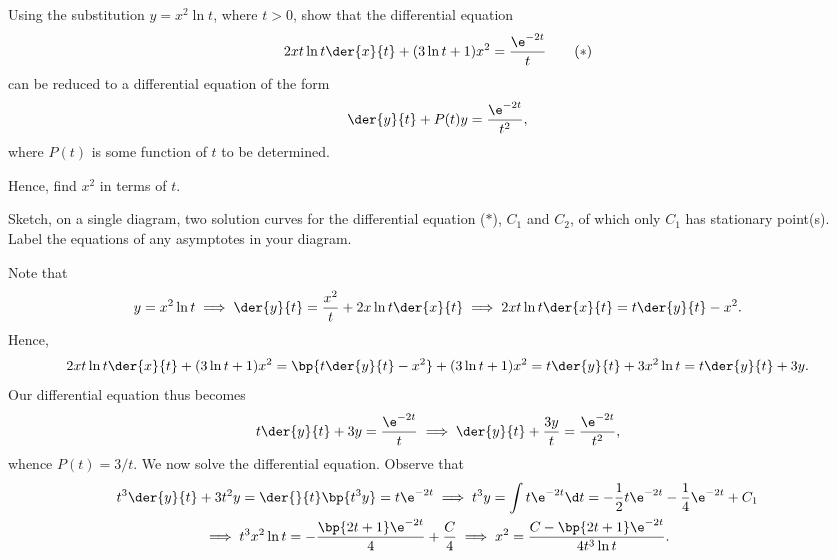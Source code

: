 \begin{problem}
    Using the substitution $y = x^2 \ln t$, where $t > 0$, show that the differential equation \[2xt \ln t \der{x}{t} + (3\ln t + 1)x^2 = \frac{\e^{-2t}}{t} \tag{$\ast$}\] can be reduced to a differential equation of the form \[\der{y}{t} + P(t) y = \frac{\e^{-2t}}{t^2},\] where $P(t)$ is some function of $t$ to be determined.

    Hence, find $x^2$ in terms of $t$.

    Sketch, on a single diagram, two solution curves for the differential equation ($\ast$), $C_1$ and $C_2$, of which only $C_1$ has stationary point(s). Label the equations of any asymptotes in your diagram.
\end{problem}
\begin{solution}
    Note that \[y = x^2 \ln t \implies \der{y}{t} = \frac{x^2}{t} + 2x\ln t \der{x}{t} \implies 2xt \ln t \der{x}{t} = t\der{y}{t} - x^2.\] Hence,
    \begin{gather*}
        2xt \ln t \der{x}{t} + (3\ln t + 1)x^2 = \bp{t\der{y}{t} - x^2} + (3\ln t + 1)x^2 = t\der{y}{t} + 3x^2\ln t = t\der{y}{t} + 3y.
    \end{gather*}
    Our differential equation thus becomes \[t\der{y}{t} + 3y = \frac{\e^{-2t}}{t} \implies \der{y}{t} + \frac{3y}{t} = \frac{\e^{-2t}}{t^2},\] whence $P(t) = 3/t$. We now solve the differential equation. Observe that
    \begin{gather*}
        t^3 \der{y}{t} + 3t^2y = \der{}{t} \bp{t^3 y} = t \e^{-2t} \implies t^3 y = \int t\e^{-2t} \d t = -\frac{1}{2} t\e^{-2t} - \frac14 \e^{-2t} + C_1\\
        \implies t^3 x^2 \ln t = -\frac{\bp{2t+1}\e^{-2t}}4 + \frac{C}{4} \implies x^2 = \frac{C-\bp{2t+1}\e^{-2t}}{4t^3 \ln t}.
    \end{gather*}

    \begin{center}
\end{center}
\end{solution}
